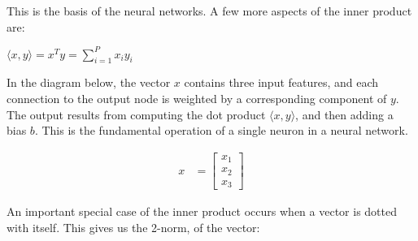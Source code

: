 This is the basis of the neural networks. A few more aspects of the inner product are:

\vspace{0.8em} 

$\langle x,y \rangle = x^T y = \sum_{i=1}^{P}x_i y_i$

\vspace{1em} 

In the diagram below, the vector $x$ contains three input features, and each connection
to the output node is weighted by a corresponding component of $y$. The output results from computing the dot product $\langle x, y \rangle$, and then adding a bias $b$. 
This is the fundamental operation of a single neuron in a neural network.


\begin{center}
	\begin{minipage}[c]{0.35\textwidth}
		\begin{align*}
			x &= \begin{bmatrix} x_1 \\ x_2 \\ x_3 \end{bmatrix}
		\end{align*}
	\end{minipage}
	\hfill
	\begin{minipage}[c]{0.6\textwidth}
	\end{minipage}
\end{center}

An important special case of the inner product occurs when a vector is dotted 
with itself. This gives us the 2-norm, of the vector:

